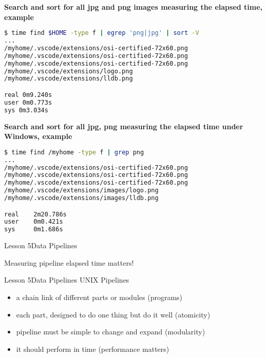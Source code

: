 \documentclass[aspectratio=1610]{beamer}
\begin{document}
\begin{frame}[fragile]
\LARGE
\textbf{Search  and sort for all jpg and png images measuring the elapsed time, example}\\
\Large
\begin{lstlisting}[language=sh]
$ time find $HOME -type f | egrep 'png|jpg' | sort -V
...
/myhome/.vscode/extensions/osi-certified-72x60.png
/myhome/.vscode/extensions/osi-certified-72x60.png
/myhome/.vscode/extensions/osi-certified-72x60.png
/myhome/.vscode/extensions/logo.png
/myhome/.vscode/extensions/lldb.png

real 0m9.240s
user 0m0.773s
sys 0m3.034s
\end{lstlisting}
\end{frame}


\begin{frame}[fragile]
\LARGE
\textbf{Search and sort for all jpg, png measuring the elapsed time under Windows, example}\\
\Large
\begin{lstlisting}[language=sh]
$ time find /myhome -type f | grep png
...
/myhome/.vscode/extensions/osi-certified-72x60.png
/myhome/.vscode/extensions/osi-certified-72x60.png
/myhome/.vscode/extensions/osi-certified-72x60.png
/myhome/.vscode/extensions/images/logo.png
/myhome/.vscode/extensions/images/lldb.png

real    2m20.786s
user    0m0.421s
sys     0m1.686s

\end{lstlisting}
\end{frame}


\begin{frame}{Lesson 5}{Data Pipelines}
\Huge
\begin{center}
Measuring pipeline elapsed time matters!
\end{center}
\end{frame}


\begin{frame}{Lesson 5}{Data Pipelines}
\LARGE
UNIX Pipelines
\begin{itemize}
    \item a chain link of different parts or modules (programs)
    \item each part, designed to do one thing but do it well (atomicity)
    \item pipeline must be simple to change and expand (modularity)
    \item it should perform in time (performance matters)
\end{itemize}
\end{frame}
\end{document}
